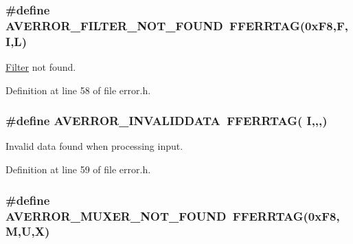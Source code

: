 \subsubsection[{\texorpdfstring{A\+V\+E\+R\+R\+O\+R\+\_\+\+F\+I\+L\+T\+E\+R\+\_\+\+N\+O\+T\+\_\+\+F\+O\+U\+ND}{AVERROR_FILTER_NOT_FOUND}}]{\setlength{\rightskip}{0pt plus 5cm}\#define A\+V\+E\+R\+R\+O\+R\+\_\+\+F\+I\+L\+T\+E\+R\+\_\+\+N\+O\+T\+\_\+\+F\+O\+U\+ND~{\bf F\+F\+E\+R\+R\+T\+AG}(0x\+F8,\textquotesingle{}\+F\textquotesingle{},\textquotesingle{}\+I\textquotesingle{},\textquotesingle{}\+L\textquotesingle{})}\hypertarget{group__lavu__error_ga2c3b3ab0404e827aeba274b571368e95}{}\label{group__lavu__error_ga2c3b3ab0404e827aeba274b571368e95}


\hyperlink{class_filter}{Filter} not found. 



Definition at line 58 of file error.\+h.

\subsubsection[{\texorpdfstring{A\+V\+E\+R\+R\+O\+R\+\_\+\+I\+N\+V\+A\+L\+I\+D\+D\+A\+TA}{AVERROR_INVALIDDATA}}]{\setlength{\rightskip}{0pt plus 5cm}\#define A\+V\+E\+R\+R\+O\+R\+\_\+\+I\+N\+V\+A\+L\+I\+D\+D\+A\+TA~{\bf F\+F\+E\+R\+R\+T\+AG}( \textquotesingle{}I\textquotesingle{},\textquotesingle{},\textquotesingle{},\textquotesingle{})}\hypertarget{group__lavu__error_gaa6e5781e75b15ce44b0baea170c98a45}{}\label{group__lavu__error_gaa6e5781e75b15ce44b0baea170c98a45}


Invalid data found when processing input. 



Definition at line 59 of file error.\+h.

\subsubsection[{\texorpdfstring{A\+V\+E\+R\+R\+O\+R\+\_\+\+M\+U\+X\+E\+R\+\_\+\+N\+O\+T\+\_\+\+F\+O\+U\+ND}{AVERROR_MUXER_NOT_FOUND}}]{\setlength{\rightskip}{0pt plus 5cm}\#define A\+V\+E\+R\+R\+O\+R\+\_\+\+M\+U\+X\+E\+R\+\_\+\+N\+O\+T\+\_\+\+F\+O\+U\+ND~{\bf F\+F\+E\+R\+R\+T\+AG}(0x\+F8,\textquotesingle{}\+M\textquotesingle{},\textquotesingle{}\+U\textquotesingle{},\textquotesingle{}\+X\textquotesingle{})}\hypertarget{group__lavu__error_ga7ef1e1f3183e34e731185967d416911d}{}\label{group__lavu__error_ga7ef1e1f3183e34e731185967d416911d}



